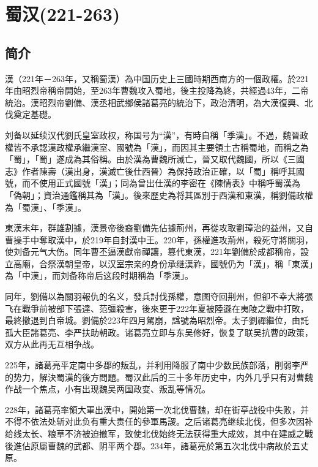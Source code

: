 

\section{蜀汉\tiny(221-263)}

\subsection{简介}

漢（221年－263年，又稱蜀漢）為中国历史上三國時期西南方的一個政權。於221年由昭烈帝稱帝開始，至263年曹魏攻入蜀地，後主投降為終，共經過43年，二帝統治。漢昭烈帝劉備、漢丞相武鄉侯諸葛亮的統治下，政治清明，為大漢復興、北伐奠定基礎。

刘备以延续汉代劉氏皇室政权，称国号为“漢”，有時自稱「季漢」。不過，魏晉政權皆不承認漢政權承繼漢室、國號為「漢」，而因其主要領土古稱蜀地，而稱之為「蜀」，「蜀」遂成為其俗稱。由於漢為曹魏所滅亡，晉又取代魏國，所以《三國志》作者陳壽（漢出身，漢滅亡後仕西晉）為保持政治正確，以「蜀」稱呼其國號，而不使用正式國號「漢」；同為曾出仕漢的李密在《陳情表》中稱呼蜀漢為「偽朝」；資治通鑑稱其為「漢」。後來歷史為将其區別于西漢和東漢，稱劉備政權為「蜀漢」、「季漢」。

東漢末年，群雄割據，漢景帝後裔劉備先佔據荊州，再從攻取劉璋治的益州，又自曹操手中奪取漢中，於219年自封漢中王。220年，孫權進攻荊州，殺死守將關羽，使刘备元气大伤。同年曹丕逼漢獻帝禪讓，篡代東漢，221年劉備於成都稱帝，設立高廟，合祭漢朝皇帝，以汉室宗亲的身份承继漢祚，國號仍为「漢」，稱「東漢」為「中漢」，而刘备称帝后这段时期稱為「季漢」。

同年，劉備以為關羽報仇的名义，發兵討伐孫權，意图夺回荆州，但卻不幸大將張飞在戰爭前被部下張達、范彊殺害，後來更于222年夏被陸遜在夷陵之戰中打敗，最終撤退到白帝城。劉備於223年四月駕崩，諡號為昭烈帝。太子劉禪繼位，由託孤大臣諸葛亮、李严扶助朝政。诸葛亮立即与东吴修好，恢复了联吴抗曹的政策，双方从此再无互相争战。

225年，諸葛亮平定南中多郡的叛乱，并利用降服了南中少数民族部落，削弱李严的势力，解決蜀漢的後方問題。蜀汉此后的三十多年历史中，内外几乎只有对曹魏作战一个焦点，小有出现魏吴两国政变、叛乱等情况。

228年，諸葛亮率領大軍出漢中，開始第一次北伐曹魏，却在街亭战役中失败，并不得不依法处斩对此负有重大责任的參軍馬謖。之后诸葛亮继续北伐，但多次因补给线太长、粮草不济被迫撤军，致使北伐始终无法获得重大成效，其中在建威之戰後進佔原屬曹魏的武都、阴平两个郡。234年，諸葛亮於第五次北伐中病故於五丈原。

